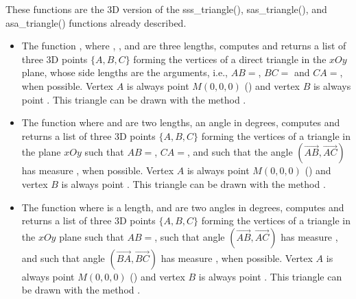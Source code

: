 These functions are the 3D version of the sss\_triangle(), sas\_triangle(), and asa\_triangle() functions already described.
\begin{itemize}
    \item The function , where , , and  are three lengths, computes and returns a list of three 3D points $\{A,B,C\}$ forming the vertices of a direct triangle in the $xOy$ plane, whose side lengths are the arguments, i.e., $AB=$, $BC=$ and $CA=$, when possible. Vertex $A$ is always point $M(0,0,0)$ () and vertex $B$ is always point . This triangle can be drawn with the method .

    \item The function  where  and  are two lengths,  an angle in degrees, computes and returns a list of three 3D points $\{A,B,C\}$ forming the vertices of a triangle in the plane $xOy$ such that $AB=$, $CA=$, and such that the angle $(\vec{AB},\vec{AC})$ has measure , when possible. Vertex $A$ is always point $M(0,0,0)$ () and vertex $B$ is always point . This triangle can be drawn with the method .

    \item The function  where  is a length,  and  are two angles in degrees, computes and returns a list of three 3D points $\{A,B,C\}$ forming the vertices of a triangle in the $xOy$ plane such that $AB=$, such that angle $(\vec{AB},\vec{AC})$ has measure , and such that angle $(\vec{BA},\vec{BC})$ has measure , when possible. Vertex $A$ is always point $M(0,0,0)$ () and vertex $B$ is always point . This triangle can be drawn with the method .
\end{itemize}
